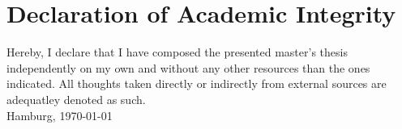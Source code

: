 \chapter*{Declaration of Academic Integrity}

Hereby, I declare that I have composed the presented master's thesis independently on my own and without any other resources than the ones indicated. All thoughts taken directly or indirectly from external sources are adequatley denoted as such.
\\[2em]
Hamburg, \today
\\[8em]
\theauthor

\newpage